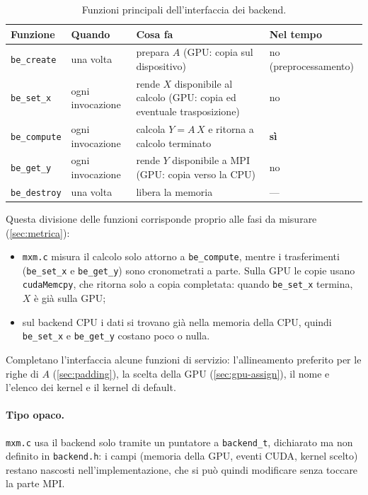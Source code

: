 \documentclass[11pt,a4paper]{article}
\begin{document}
\begin{table}[H]
  \centering
  \caption{Funzioni principali dell'interfaccia dei backend.}\label{tab:interfaccia}
  \begin{tabular}{l l p{} p{}}
    \toprule
    Funzione & Quando & Cosa fa & Nel tempo \\
    \midrule
    \texttt{be\_create}  & una volta     & prepara $A$ (GPU: copia sul dispositivo)
                         & no (preprocessamento) \\
    \texttt{be\_set\_x}  & ogni invocazione & rende $X$ disponibile al calcolo
                           (GPU: copia ed eventuale trasposizione) & no \\
    \texttt{be\_compute} & ogni invocazione & calcola $Y = A\,X$ e ritorna a
                           calcolo terminato & \textbf{sì} \\
    \texttt{be\_get\_y}  & ogni invocazione & rende $Y$ disponibile a MPI
                           (GPU: copia verso la CPU) & no \\
    \texttt{be\_destroy} & una volta     & libera la memoria & --- \\
    \bottomrule
  \end{tabular}
\end{table}

Questa divisione delle funzioni corrisponde proprio alle fasi da misurare
(\cref{sec:metrica}):
\begin{itemize}
  \item \texttt{mxm.c} misura il calcolo solo attorno a \texttt{be\_compute},
        mentre i trasferimenti (\texttt{be\_set\_x} e \texttt{be\_get\_y}) sono
        cronometrati a parte. Sulla GPU le copie usano \texttt{cudaMemcpy},
        che ritorna solo a copia completata: quando \texttt{be\_set\_x}
        termina, $X$ è già sulla GPU;
  \item sul backend CPU i dati si trovano già nella memoria della CPU, quindi
        \texttt{be\_set\_x} e \texttt{be\_get\_y} costano poco o nulla.
\end{itemize}
Completano l'interfaccia alcune funzioni di servizio: l'allineamento preferito
per le righe di $A$ (\cref{sec:padding}), la scelta della GPU
(\cref{sec:gpu-assign}), il nome e l'elenco dei kernel e il kernel di default.

\paragraph{Tipo opaco.} \texttt{mxm.c} usa il backend solo tramite un puntatore
a \texttt{backend\_t}, dichiarato ma non definito in \texttt{backend.h}: i
campi (memoria della GPU, eventi CUDA, kernel scelto) restano nascosti
nell'implementazione, che si può quindi modificare senza toccare la parte MPI.
\end{document}
